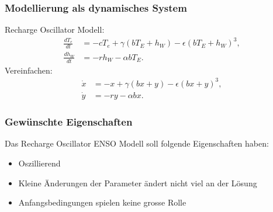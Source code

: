 \documentclass[ngerman, aspectratio=169]{beamer}
\begin{document}
    \begin{frame}
        \frametitle{Modellierung als dynamisches System}
        Recharge Oscillator Modell:
        \begin{align*}
            \frac{dT_e}{dt} &= -cT_e + \gamma \left(bT_E + h_W\right) - \epsilon \left(bT_E + h_W\right)^3, \\
            \frac{dh_W}{dt} &= -rh_W - \alpha b T_E.
        \end{align*}
        \pause
        Vereinfachen:
        \begin{align*}
            \dot{x} &= -x + \gamma \left(bx + y\right) - \epsilon \left(bx + y\right)^3, \\
            \dot{y} &= -ry - \alpha b x.
        \end{align*}
    \end{frame}

    \begin{frame}
    \frametitle{Gewünschte Eigenschaften}
        Das Recharge Oscillator ENSO Modell soll folgende Eigenschaften haben:
        \begin{itemize}
            \item Oszillierend
            \item Kleine Änderungen der Parameter ändert nicht viel an der Lösung
            \item Anfangsbedingungen spielen keine grosse Rolle
        \end{itemize}
    \end{frame}
\end{document}
